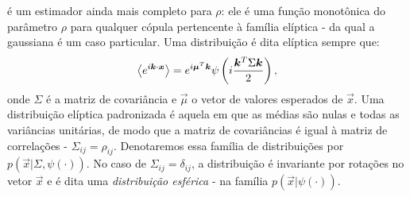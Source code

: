  é um estimador ainda mais completo para $\rho$: ele é uma função monotônica do parâmetro $\rho$ para qualquer cópula pertencente à família elíptica - da qual a gaussiana é um caso particular. Uma distribuição é dita elíptica sempre que: 
\begin{equation}
\label{eq:eliptical}
\avg{e^{i\vec{k}\cdot\vec{x}} } = e^{i\vec{\mu}^{T}\vec{k}} \psi\left(i\frac{\vec{k}^{T}\Sigma\vec{k}}{2}\right),
\end{equation}
onde $\Sigma$ é a matriz de covariância e $\vec{\mu}$ o vetor de valores esperados de $\vec{x}$. Uma distribuição elíptica padronizada é aquela em que as médias são nulas e todas as variâncias unitárias, de modo que a matriz de covariâncias é igual à matriz de correlações - $\Sigma_{ij} = \rho_{ij}$. Denotaremos essa família de distribuições por $p(\vec{x} | \Sigma, \psi(\cdot))$. No caso de $\Sigma_{ij} = \delta_{ij}$, a distribuição é invariante por rotações no vetor $\vec{x}$ e é dita uma \textit{distribuição esférica} - na família 
$p(\vec{x} | \psi(\cdot))$. 

